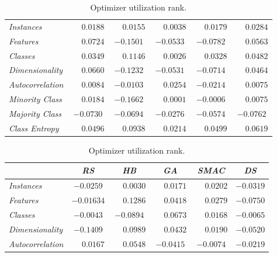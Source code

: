 \begin{table}[ht]
\begin{subtable}{\textwidth}
\begin{tabular}{l|ccccc}
            \hline
            \textit{Instances} & $\phantom{-}0.0188$ & $\phantom{-}0.0155$ & $\phantom{-}0.0038$ & $\phantom{-}0.0179$ & $\phantom{-}0.0284$ \\
            \textit{Features} & $\phantom{-}0.0724$ & $-0.1501$ & $-0.0533$ & $-0.0782$ & $\phantom{-}0.0563$ \\
            \textit{Classes} & $\phantom{-}0.0349$ & $\phantom{-}0.1146$ & $\phantom{-}0.0026$ & $\phantom{-}0.0328$ & $\phantom{-}0.0482$ \\
            \textit{Dimensionality} & $\phantom{-}0.0660$ &$ -0.1232$ & $-0.0531$ & $-0.0714$ & $\phantom{-}0.0464$ \\
            \textit{Autocorrelation} & $\phantom{-}0.0084$ & $-0.0103$ & $\phantom{-}0.0254$ & $-0.0214$ & $\phantom{-}0.0075$ \\
            \textit{Minority Class} & $\phantom{-}0.0184$ & $-0.1662$ & $\phantom{-}0.0001$ & $-0.0006$ & $\phantom{-}0.0075$ \\
            \textit{Majority Class} & $-0.0730$ & $-0.0694$ & $-0.0276$ & $-0.0574$ & $-0.0762$ \\
            \textit{Class Entropy} & $\phantom{-}0.0496$ & $\phantom{-}0.0938$ & $\phantom{-}0.0214$ & $\phantom{-}0.0499$ & $\phantom{-}0.0619$ \\
            \hline
        \end{tabular}
    \end{subtable}
    \par\bigskip
    \begin{subtable}{\textwidth}
        \centering
        \caption{Optimizer utilization rank.}
        \begin{tabular}{l|ccccc}
            & \textit{RS} & \textit{HB} & \textit{GA} & \textit{SMAC} & \textit{DS} \\
            \hline
            \textit{Instances} & $-0.0259$ & $\phantom{-}0.0030$ & $\phantom{-}0.0171$ & $\phantom{-}0.0202$ & $-0.0319$ \\
            \textit{Features} & $-0.01634$ & $\phantom{-}0.1286$ & $\phantom{-}0.0418$ & $\phantom{-}0.0279$ & $-0.0750$ \\
            \textit{Classes} & $-0.0043$ & $-0.0894$ & $\phantom{-}0.0673$ & $\phantom{-}0.0168$ & $-0.0065$ \\
            \textit{Dimensionality} & $-0.1409$ & $\phantom{-}0.0989$ & $\phantom{-}0.0432$ & $\phantom{-}0.0190$ & $-0.0520$ \\
            \textit{Autocorrelation} & $\phantom{-}0.0167$ & $\phantom{-}0.0548$ & $-0.0415$ & $-0.0074$ & $-0.0219$ \\

\end{tabular}
\end{subtable}
\end{table}
